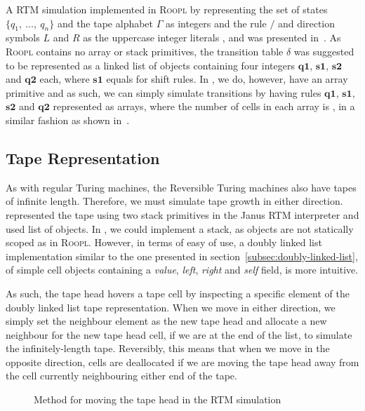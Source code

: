 A RTM simulation implemented in \textsc{Roopl} by representing the set of states $\{q_1,\ \dots,\ q_n\}$ and the tape alphabet $\Gamma$ as integers and the rule $/$ and direction symbols $L$ and $R$ as the uppercase integer literals ,  and  was presented in~\cite{th:roopl}. As \textsc{Roopl} contains no array or stack primitives, the transition table $\delta$ was suggested to be represented as a linked list of objects containing four integers ${\textbf{q1}}$, ${\textbf{s1}}$, ${\textbf{s2}}$ and ${\textbf{q2}}$ each, where ${\textbf{s1}}$ equals  for shift rules. In \rooplpp, we do, however, have an array primitive and as such, we can simply simulate transitions by having rules ${\textbf{q1}}$, ${\textbf{s1}}$, ${\textbf{s2}}$ and ${\textbf{q2}}$ represented as arrays, where the number of cells in each array is , in a similar fashion as shown in~\cite{ty:ejanus}.

\subsection{Tape Representation}
\label{subsec:tape-representation}
As with regular Turing machines, the Reversible Turing machines also have tapes of infinite length. Therefore, we must simulate tape growth in either direction.
\citeauthor{ty:ejanus} represented the tape using two stack primitives in the Janus RTM interpreter and \citeauthor{th:roopl} used list of objects. In \rooplpp, we could implement a stack, as objects are not statically scoped as in \textsc{Roopl}. However, in terms of easy of use, a doubly linked list implementation similar to the one presented in section~\ref{subsec:doubly-linked-list}, of simple cell objects containing a \textit{value}, \textit{left}, \textit{right} and \textit{self} field, is more intuitive.

As such, the tape head hovers a tape cell by inspecting a specific element of the doubly linked list tape representation. When we move in either direction, we simply set the neighbour element as the new tape head and allocate a new neighbour for the new tape head cell, if we are at the end of the list, to simulate the infinitely-length tape. Reversibly, this means that when we move in the opposite direction, cells are deallocated if we are moving the tape head away from the cell currently neighbouring either end of the tape.

\begin{figure}[ht]
    \centering
    
    \caption{Method for moving the tape head in the RTM simulation}
    \label{fig:rtm-move-tape-head-method}
\end{figure}

